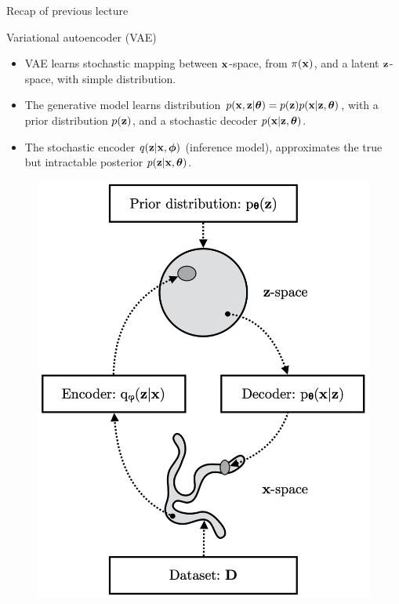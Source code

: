 

\begin{frame}
\titlepage
\end{frame}
\begin{frame}{Recap of previous lecture}
	\begin{minipage}[t]{0.55\columnwidth}
		\begin{block}{Variational autoencoder (VAE)}
		    \begin{itemize}
			    \item VAE learns stochastic mapping between $\mathbf{x}$-space, from $\pi(\mathbf{x})$, and a latent $\mathbf{z}$-space, with simple distribution. 
			    \item The generative model learns  distribution $p(\mathbf{x}, \mathbf{z} | \boldsymbol{\theta}) = p(\mathbf{z}) p(\mathbf{x} |\mathbf{z}, \boldsymbol{\theta})$, with a prior distribution $p(\mathbf{z})$, and a stochastic decoder $p(\mathbf{x}|\mathbf{z}, \boldsymbol{\theta})$. 
			    \item The stochastic encoder $q(\mathbf{z}|\mathbf{x}, \boldsymbol{\phi})$ (inference model), approximates the true but intractable posterior $p(\mathbf{z}|\mathbf{x}, \boldsymbol{\theta})$.
		    \end{itemize}
	    \end{block}
	\end{minipage}%
	\begin{minipage}[t]{0.45\columnwidth}
		\vspace{0.7cm}
		\begin{figure}[h]
			\centering
			\includegraphics[width=\linewidth]{figs/vae_scheme}

\end{figure}
\end{minipage}
\end{frame}
